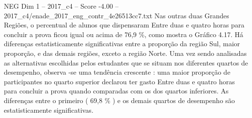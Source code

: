 \begin{textsample}{NEG Dim 1 – 2017\_c4 – Score -4.00 – 2017\_c4/enade\_2017\_eng\_contr\_4e26513cc7.txt}
Nas outras duas Grandes Regiões, o percentual de alunos que dispensaram Entre duas e quatro horas para concluir a prova ficou igual ou acima de 76,9 \%, como mostra o Gráfico 4.17.
Há diferenças estatisticamente significativas entre a proporção da região Sul, maior proporção, e das demais regiões, exceto a região Norte.
Uma vez sendo analisadas as alternativas escolhidas pelos estudantes que se situam nos diferentes quartos de desempenho, observa -se uma tendência crescente : uma maior proporção de participantes no quarto superior declarou ter gasto Entre duas e quatro horas para concluir a prova quando comparadas com os dos quartos inferiores.
As diferenças entre o primeiro ( 69,8 \% ) e os demais quartos de desempenho são estatisticamente significativas.

\end{textsample}
